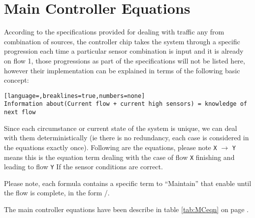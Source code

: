 \section{Main Controller Equations}
According to the specifications provided for dealing with traffic any from
combination of sources, the controller chip takes the system through a specific
progression each time a particular sensor combination is input and it is already
on flow 1, those progressions as part of the specifications will not be listed
here, however their implementation can be explained in terms of the following
basic concept:
\begin{lstlisting}[language=,breaklines=true,numbers=none]
Information about(Current flow + current high sensors) = knowledge of next flow
\end{lstlisting}
Since each circumstance or current state of the system is unique, we can deal
with them deterministically (ie there is no redundancy, each case is considered
in the equations exactly once). Following are the equations, please note
\texttt{X} $\to$ \texttt{Y} means this is the equation term dealing with the
case of flow \texttt{X} finishing and leading to flow \texttt{Y} If the sensor
conditions are correct.

Please note, each \ENX formula contains a specific term to ``Maintain'' that
enable until the flow is complete, in the form \ENX * /\FFX.

The main controller equations have been describe in table \ref{tab:MCeqn} on
page \pageref{tab:MCeqn}.
